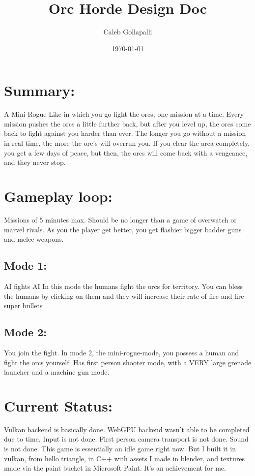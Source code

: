 \documentclass[11pt]{article}
\author{Caleb Gollapalli}
\date{\today}
\title{Orc Horde Design Doc}
\begin{document}
\maketitle
\tableofcontents

\section{Summary:}
\label{sec:orgb459322}
A Mini-Rogue-Like in which you go fight the orcs, one mission at a time.
Every mission pushes the orcs a little further back, but after you level up, the orcs come back to fight against you harder than ever.
The longer you go without a mission in real time, the more the orc's will overrun you.
If you clear the area completely, you get a few days of peace, but then, the orcs will come back with a vengeance, and they never stop.
\section{Gameplay loop:}
\label{sec:org5da6ee9}
Missions of 5 minutes max. Should be no longer than a game of overwatch or marvel rivals.
As you the player get better, you get flashier bigger badder guns and melee weapons.
\subsection{Mode 1:}
\label{sec:orgb47cbdd}
AI fights AI
In this mode the humans fight the orcs for territory. You can bless the humans by clicking on them and they will increase their rate of fire and fire super bullets
\subsection{Mode 2:}
\label{sec:orgf7503cb}
You join the fight.
In mode 2, the mini-rogue-mode, you possess a human and fight the orcs yourself. Has first person shooter mode, with a VERY large grenade launcher and a machine gun mode.
\section{Current Status:}
\label{sec:org160c03d}
Vulkan backend is basically done.
WebGPU backend wasn't able to be completed due to time.
Input is not done.
First person camera transport is not done.
Sound is not done.
This game is essentially an idle game right now. But I built it in vulkan, from hello triangle, in C++ with assets I made in blender, and textures made via the paint bucket in Microsoft Paint. It's an achievement for me.
\end{document}
